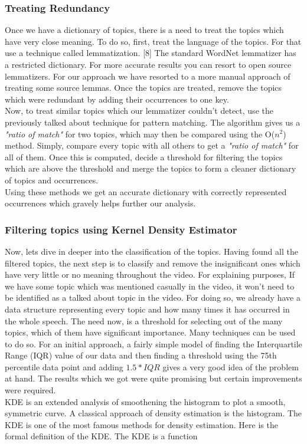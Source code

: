 \documentclass[conference]{IEEEtran}
\begin{document}
\subsubsection{\textbf{Treating Redundancy}}
Once we have a dictionary of topics, there is a need to treat the topics which have very close meaning. To do so, first, treat the language of the topics. For that use a technique called lemmatization. [8] The standard WordNet lemmatizer has a restricted dictionary. For more accurate results you can resort to open source lemmatizers. For our approach we have resorted to a more manual approach of treating some source lemmas. Once the topics are treated, remove the topics which were redundant by adding their occurrences to one key.\\
\indent Now, to treat similar topics which our lemmatizer couldn't detect, use the previously talked about technique for pattern matching. The algorithm gives us a \textit{"ratio of match"} for two topics, which may then be compared using the O($n^2$) method. Simply, compare every topic with all others to get a \textit{"ratio of match"} for all of them. Once this is computed, decide a threshold for filtering the topics which are above the threshold and merge the topics to form a cleaner dictionary of topics and occurrences.\\
\indent Using these methods we get an accurate dictionary with correctly represented occurrences which gravely helps further our analysis.

\subsubsection{\textbf{Filtering topics using Kernel Density Estimator}} 

Now, lets dive in deeper into the classification of the topics. Having found all the filtered topics, the next step is to classify and remove the insignificant ones which have very little or no meaning throughout the video. For explaining purposes, If we have some topic which was mentioned casually in the video, it won’t need to be identified as a talked about topic in the video. For doing so, we already have a data structure representing every topic and how many times it has occurred in the whole speech. The need now, is a threshold for selecting out of the many topics, which of them have significant importance. Many techniques can be used to do so. For an initial approach, a fairly simple model of finding the Interquartile Range (IQR) value of our data and then finding a threshold using the 75th percentile data point and adding $1.5*IQR$ gives a very good idea of the problem at hand. The results which we got were quite promising but certain improvements were required.\\
\indent KDE is an extended analysis of smoothening the histogram to plot a smooth, symmetric curve. A classical approach of density estimation is the histogram. The KDE is one of the most famous methods for density estimation. Here is the formal definition of the KDE. The KDE is a function
\end{document}
